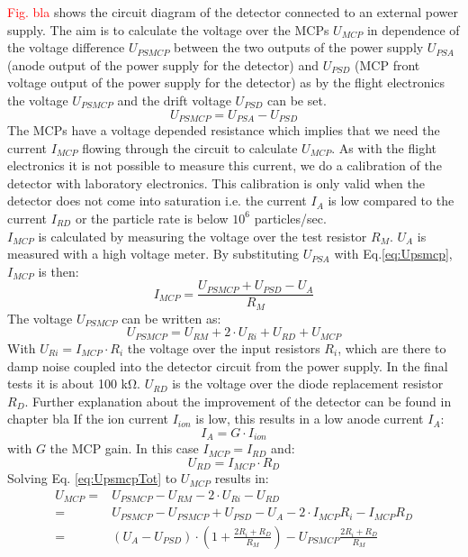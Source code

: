 		\textcolor{red}{Fig. bla} shows the circuit diagram of the detector connected to an external power supply. The aim is to calculate the voltage over the MCPs $U_{MCP}$ in dependence of the voltage difference $U_{PSMCP}$ between the two outputs of the power supply $U_{PSA}$ (anode output of the power supply for the detector) and $U_{PSD}$ (MCP front voltage output of the power supply for the detector) as by the flight electronics the voltage $U_{PSMCP}$ and the drift voltage $U_{PSD}$ can be set.\\
		\begin{equation}
			U_{PSMCP} = U_{PSA} - U_{PSD}
			\label{eq:Upsmcp}
		\end{equation} %
		The MCPs have a voltage depended resistance which implies that we need the current $I_{MCP}$ flowing through the circuit to calculate $U_{MCP}$. As with the flight electronics it is not possible to measure this current, we do a calibration of the detector with laboratory electronics. This calibration is only valid when the detector does not come into saturation i.e. the current $I_A$ is low compared to the current $I_{RD}$ or the particle rate is below $10^6$ particles/sec.\\ %
		$I_{MCP}$ is calculated by measuring the voltage over the test resistor $R_M$. $U_A$ is measured with a high voltage meter. By substituting $U_{PSA}$ with Eq.\eqref{eq:Upsmcp}, $I_{MCP}$ is then:
		\begin{equation}
			I_{MCP} = \frac{U_{PSMCP} + U_{PSD}-U_A}{R_M}
		\end{equation}
		The voltage $U_{PSMCP}$ can be written as:
		\begin{equation}
			U_{PSMCP} = U_{RM} + 2\cdot U_{Ri} + U_{RD} + U_{MCP}
			\label{eq:UpsmcpTot}
		\end{equation}
		With $U_{Ri} = I_{MCP}\cdot R_i$ the voltage over the input resistors $R_i$, which are there to damp noise coupled into the detector circuit from the power supply. In the final tests it is about 100 \si{\kilo\ohm}. $U_{RD}$ is the voltage over the diode replacement resistor $R_D$. Further explanation about the improvement of the detector can be found in chapter bla %
		If the ion current $I_{ion}$ is low, this results in a low anode current $I_A$:
		\begin{equation}
			I_A = G\cdot I_{ion}
		\end{equation}
		with $G$ the MCP gain. %
		In this case $I_{MCP} = I_{RD}$ and:
		\begin{equation}
			U_{RD} = I_{MCP}\cdot R_D
		\end{equation}
		Solving Eq. \eqref{eq:UpsmcpTot} to $U_{MCP}$ results in:
		\begin{align}
			U_{MCP} =& U_{PSMCP} - U_{RM} - 2\cdot U_{Ri} - U_{RD}\\
					=& U_{PSMCP} - U_{PSMCP} + U_{PSD} - U_A - 2\cdot I_{MCP} R_i - I_{MCP} R_D\\
					=& (U_A - U_{PSD})\cdot(1 + \frac{2R_i + R_D}{R_M}) - U_{PSMCP}\frac{2R_i + R_D}{R_M}
		\end{align}
		
